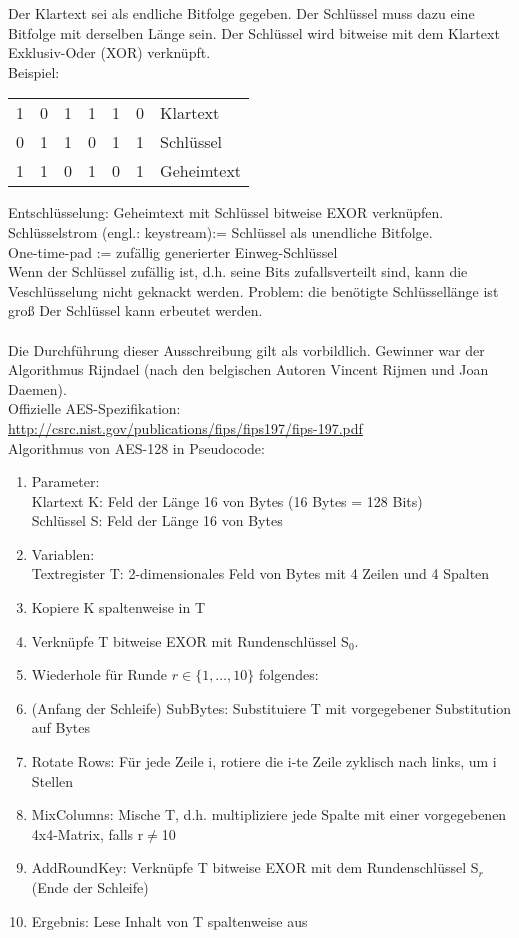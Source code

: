 \documentclass[a4paper,12pt]{article}
\begin{document}
Der Klartext sei als endliche Bitfolge gegeben. Der Schlüssel muss dazu eine Bitfolge mit derselben Länge sein. Der Schlüssel wird bitweise mit dem Klartext Exklusiv-Oder (XOR) verknüpft.\\
Beispiel:
\begin{table}[h]
\centering
\begin{tabular}{l l l l l l l}
1 & 0 & 1 & 1 & 1 & 0 & Klartext\\
0 & 1 & 1 & 0 & 1 & 1 & Schlüssel\\\hline
1 & 1 & 0 & 1 & 0 & 1 & Geheimtext
\end{tabular}
\end{table}

Entschlüsselung: Geheimtext mit Schlüssel bitweise EXOR verknüpfen.\\
Schlüsselstrom (engl.: keystream):= Schlüssel als unendliche Bitfolge.\\
One-time-pad := zufällig generierter Einweg-Schlüssel\\
Wenn der Schlüssel zufällig ist, d.h. seine Bits  zufallsverteilt sind, kann die Veschlüsselung nicht geknackt werden.
Problem: die benötigte Schlüssellänge ist groß Der Schlüssel kann erbeutet werden.
\\
\\
Die Durchführung dieser Ausschreibung gilt als vorbildlich. Gewinner war der Algorithmus Rijndael (nach den belgischen Autoren Vincent Rijmen und Joan Daemen).\\
Offizielle AES-Spezifikation:\\
\url{http://csrc.nist.gov/publications/fips/fips197/fips-197.pdf}\\
Algorithmus von AES-128 in Pseudocode:
\begin{enumerate}
  \item Parameter:\\
	Klartext K: Feld der Länge 16 von Bytes (16 Bytes = 128 Bits)\\
	Schlüssel S: Feld der Länge 16 von Bytes
  \item Variablen:\\
	Textregister T: 2-dimensionales Feld von Bytes mit 4 Zeilen und 4 Spalten
  \item Kopiere K spaltenweise in T
  \item Verknüpfe T bitweise EXOR mit Rundenschlüssel S$_0$.
  \item Wiederhole für Runde $r\in\{1,\dots,10\}$ folgendes:
  \item (Anfang der Schleife) SubBytes: Substituiere T mit vorgegebener Substitution auf Bytes
  \item Rotate Rows: Für jede Zeile i, rotiere die i-te Zeile zyklisch nach links, um i Stellen
  \item MixColumns: Mische T, d.h. multipliziere jede Spalte mit einer vorgegebenen 4x4-Matrix, falls r$\neq$10
  \item AddRoundKey: Verknüpfe T bitweise EXOR mit dem Rundenschlüssel S$_r$ (Ende der Schleife)
  \item Ergebnis: Lese Inhalt von T spaltenweise aus
\end{enumerate}
\end{document}
